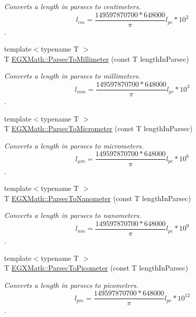 \begin{DoxyCompactItemize}
\begin{DoxyCompactList}\small\item\em Converts a length in parsecs to centimeters. \[ l_{cm}=\frac{149597870700 * 648000}{\pi}l_{pc} * 10^{2} \]. \end{DoxyCompactList}\item 
{\footnotesize template$<$typename T $>$ }\\T \mbox{\hyperlink{group___e_g_x_math-_conversions-_length_conversions-_astronomical-_parsec-_s_i_ga5ea5a5b0860b6c6ad260425079db2ee2}{E\+G\+X\+Math\+::\+Parsec\+To\+Millimeter}} (const T length\+In\+Parsec)
\begin{DoxyCompactList}\small\item\em Converts a length in parsecs to millimeters. \[ l_{mm}=\frac{149597870700 * 648000}{\pi}l_{pc} * 10^{3} \]. \end{DoxyCompactList}\item 
{\footnotesize template$<$typename T $>$ }\\T \mbox{\hyperlink{group___e_g_x_math-_conversions-_length_conversions-_astronomical-_parsec-_s_i_ga1eea34f6cb4b5a7b5dec1cd75863f191}{E\+G\+X\+Math\+::\+Parsec\+To\+Micrometer}} (const T length\+In\+Parsec)
\begin{DoxyCompactList}\small\item\em Converts a length in parsecs to micrometers. \[ l_{\mu m}=\frac{149597870700 * 648000}{\pi}l_{pc} * 10^{6} \]. \end{DoxyCompactList}\item 
{\footnotesize template$<$typename T $>$ }\\T \mbox{\hyperlink{group___e_g_x_math-_conversions-_length_conversions-_astronomical-_parsec-_s_i_gab2226196e39edbba8fe0862d0fd75870}{E\+G\+X\+Math\+::\+Parsec\+To\+Nanometer}} (const T length\+In\+Parsec)
\begin{DoxyCompactList}\small\item\em Converts a length in parsecs to nanometers. \[ l_{nm}=\frac{149597870700 * 648000}{\pi}l_{pc} * 10^{9} \]. \end{DoxyCompactList}\item 
{\footnotesize template$<$typename T $>$ }\\T \mbox{\hyperlink{group___e_g_x_math-_conversions-_length_conversions-_astronomical-_parsec-_s_i_ga2d56b414320940d42a8956239e54c8b0}{E\+G\+X\+Math\+::\+Parsec\+To\+Picometer}} (const T length\+In\+Parsec)
\begin{DoxyCompactList}\small\item\em Converts a length in parsecs to picometers. \[ l_{pm}=\frac{149597870700 * 648000}{\pi}l_{pc} * 10^{12} \]. \end{DoxyCompactList}\item 

\end{DoxyCompactItemize}
